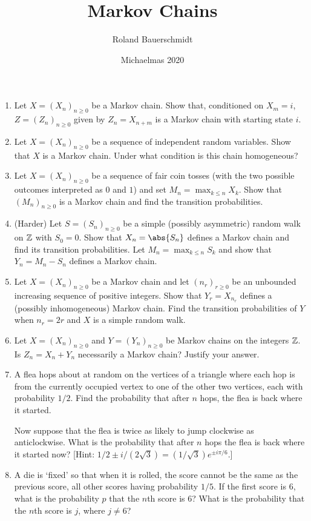 \documentclass[a4paper,12pt]{article}
\title{Markov Chains}
\author{Roland Bauerschmidt}
\date{Michaelmas 2020}
\begin{document}
\thispagestyle{firststyle}

\begin{enumerate}[label=\arabic*.,leftmargin=*]
 \item
  Let \(X = (X_n)_{n \ge 0}\) be a Markov chain. Show that, conditioned on
  \(X_m = i\), \mbox{\(Z = (Z_n)_{n \ge 0}\)} given by
  \(Z_n = X_{n + m}\) is a Markov chain with starting state \(i\).
 \item
  Let \(X = (X_n)_{n \ge 0}\) be a sequence of independent random variables.
  Show that \(X\) is a Markov chain. Under what condition is this chain
  homogeneous?
 \item
  Let \(X = (X_n)_{n \ge 0}\) be a sequence of fair coin tosses (with the two
  possible outcomes interpreted as \(0\) and \(1\)) and set
  \(M_n = \max_{k \le n} X_k\). Show that \((M_n)_{n \ge 0}\) is a Markov chain
  and find the transition probabilities.
 \item (Harder)
  Let \(S = (S_n)_{n \ge 0}\) be a simple (possibly asymmetric) random walk on
  \(\mathbb Z\) with \(S_0 = 0\). Show that \(X_n = \abs{S_n}\) defines a Markov chain
  and find its transition probabilities. Let \(M_n = \max_{k \le n} S_k\) and
  show that \(Y_n = M_n - S_n\) defines a Markov chain.
 \item
  Let \(X = (X_n)_{n \ge 0}\) be a Markov chain and let \((n_r)_{r \ge 0}\) be an
  unbounded increasing sequence of positive integers. Show that
  \(Y_r = X_{n_r}\) defines a (possibly inhomogeneous) Markov chain. Find the
  transition probabilities of \(Y\) when \(n_r = 2r\) and \(X\) is a simple
  random walk.
 \item
  Let \(X = (X_n)_{n \ge 0}\) and \(Y = (Y_n)_{n \ge 0}\) be Markov chains on
  the integers \(\mathbb Z\). Is \mbox{\(Z_n = X_n + Y_n\)} necessarily a Markov chain?
  Justify your answer.
 \item
  A flea hops about at random on the vertices of a triangle where each hop is
  from the currently occupied vertex to one of the other two vertices, each with
  probability \(1/2\). Find the probability that after \(n\) hops, the flea is
  back where it started.

  Now suppose that the flea is twice as likely to jump clockwise as
  anticlockwise. What is the probability that after \(n\) hops the flea is back
  where it started now?
  [Hint: \(1/2 \pm i/(2 \sqrt 3) = (1 / \sqrt 3)e^{\pm i\pi/6}\).]
 \item
  A die is `fixed' so that when it is rolled, the score cannot be the same as
  the previous score, all other scores having probability \(1/5\). If the first
  score is \(6\), what is the probability \(p\) that the \(n\)th score is \(6\)?
  What is the probability that the \(n\)th score is \(j\), where \(j \ne 6\)?


\end{enumerate}
\end{document}
